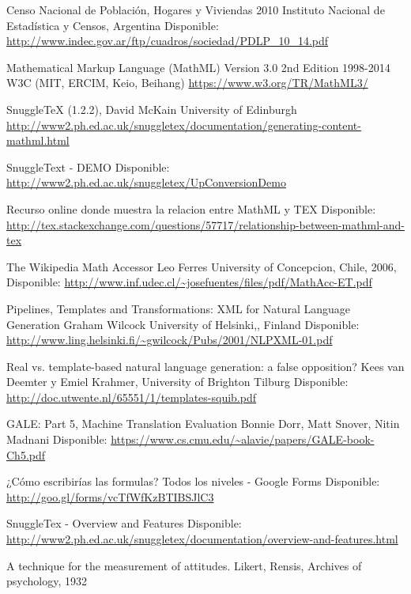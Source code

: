 \documentclass[
11pt, %
oneside, %
english, %
doublespacing, %
nolistspacing, %
parskip, %
parident,
headsepline, %
]{MastersDoctoralThesis} %
\begin{document}
\renewcommand{\bibname}{Referencias}
\begin{thebibliography}{99}

Censo Nacional de Población,
Hogares y Viviendas 2010
Instituto Nacional de Estadística y Censos, Argentina
Disponible: \url{http://www.indec.gov.ar/ftp/cuadros/sociedad/PDLP_10_14.pdf}

Mathematical Markup Language (MathML) Version 3.0 2nd Edition
1998-2014 W3C (MIT, ERCIM, Keio, Beihang)
\url{https://www.w3.org/TR/MathML3/}

SnuggleTeX (1.2.2), David McKain
University of Edinburgh
\url{http://www2.ph.ed.ac.uk/snuggletex/documentation/generating-content-mathml.html}

SnuggleText - DEMO
Disponible: \url{http://www2.ph.ed.ac.uk/snuggletex/UpConversionDemo}

Recurso online donde muestra la relacion entre MathML y TEX
Disponible: \url{http://tex.stackexchange.com/questions/57717/relationship-between-mathml-and-tex}

The Wikipedia Math Accessor
Leo Ferres
University of Concepcion, Chile, 2006,
Disponible: \url{http://www.inf.udec.cl/~josefuentes/files/pdf/MathAcc-ET.pdf}

Pipelines, Templates and Transformations: XML for Natural Language Generation
Graham Wilcock
University of Helsinki,, Finland
Disponible: \url{http://www.ling.helsinki.fi/~gwilcock/Pubs/2001/NLPXML-01.pdf}

Real vs. template-based natural language generation: a false opposition?
Kees van Deemter y Emiel Krahmer,
University of Brighton Tilburg
Disponible: \url{http://doc.utwente.nl/65551/1/templates-squib.pdf}

GALE: Part 5,  Machine Translation Evaluation
Bonnie Dorr, Matt Snover, Nitin Madnani
Disponible: \url{https://www.cs.cmu.edu/~alavie/papers/GALE-book-Ch5.pdf}

¿Cómo escribirías las formulas?
Todos los niveles - Google Forms
Disponible: \url{http://goo.gl/forms/vcTfWfKzBTIBSJlC3}

SnuggleTex - Overview and Features
Disponible: \url{http://www2.ph.ed.ac.uk/snuggletex/documentation/overview-and-features.html}

A technique for the measurement of attitudes. Likert, Rensis, Archives of psychology, 1932

\end{thebibliography}
\end{document}
